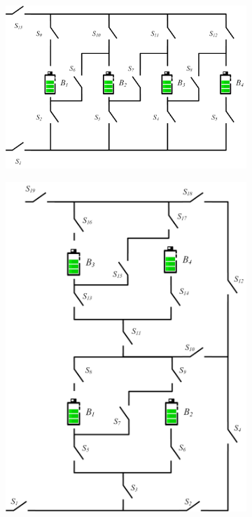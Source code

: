 \documentclass{article}
\begin{document}
\begin{figure}[htbp]
\begin{subfigure}[b]{0.15\textwidth}
        \caption{}
        \label{fig:arch-f}
    \end{subfigure}
    \hspace{0.05\textwidth}
    \begin{subfigure}[b]{0.3\textwidth}
        \includegraphics[width=\textwidth]{../attachments/arch-f.png}
        \caption{}
        \label{fig:arch-e}
    \end{subfigure}
    \begin{subfigure}[b]{0.3\textwidth}
        \includegraphics[width=\textwidth]{../attachments/arch-fe.png}

\end{subfigure}
\end{figure}
\end{document}
